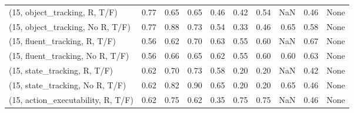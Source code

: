 \begin{table*}[h!]
\begin{adjustbox}{width=2\columnwidth,center}
\begin{tabular}{lrrr|rrr|rrr}
\midrule
(15, object\_tracking, R, T/F)         &                      0.77 &                  0.65 &                      0.65 &                          0.46 &                      0.42 &                          0.54 &                                    NaN &                               0.46 &                                  None \\
(15, object\_tracking, No R, T/F)      &                      0.77 &                  0.88 &                      0.73 &                          0.54 &                      0.33 &                          0.46 &                                   0.65 &                               0.58 &                                  None \\
(15, fluent\_tracking, R, T/F)         &                      0.56 &                  0.62 &                      0.70 &                          0.63 &                      0.55 &                          0.60 &                                    NaN &                               0.67 &                                  None \\
(15, fluent\_tracking, No R, T/F)      &                      0.56 &                  0.66 &                      0.65 &                          0.62 &                      0.55 &                          0.60 &                                   0.60 &                               0.63 &                                  None \\
(15, state\_tracking, R, T/F)          &                      0.62 &                  0.70 &                      0.73 &                          0.58 &                      0.20 &                          0.20 &                                    NaN &                               0.42 &                                  None \\
(15, state\_tracking, No R, T/F)       &                      0.62 &                  0.82 &                      0.90 &                          0.65 &                      0.20 &                          0.20 &                                   0.65 &                               0.46 &                                  None \\
(15, action\_executability, R, T/F)    &                      0.62 &                  0.75 &                      0.62 &                          0.35 &                      0.75 &                          0.75 &                                    NaN &                               0.46 &                                  None \\

\end{tabular}
\end{adjustbox}
\end{table*}

